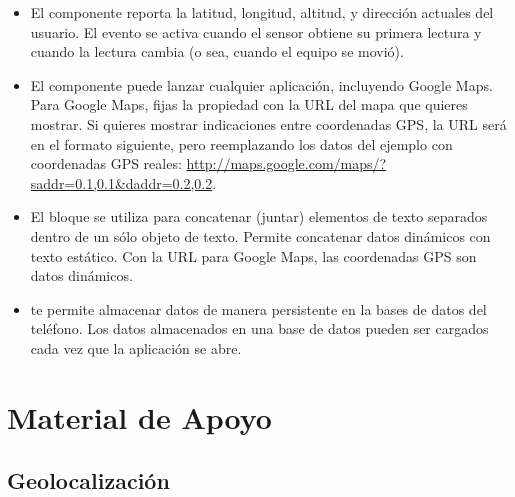 \begin{itemize}

\item El componente  reporta la latitud,
  longitud, altitud, y dirección actuales del usuario. El evento
   se activa cuando el sensor obtiene su
  primera lectura y cuando la lectura cambia (o sea, cuando el equipo
  se movió).

\item El componente  puede lanzar cualquier
  aplicación, incluyendo Google Maps. Para Google Maps, fijas la
  propiedad  con la URL del mapa que quieres
  mostrar. Si quieres mostrar indicaciones entre coordenadas GPS, la
  URL será en el formato siguiente, pero reemplazando los datos del
  ejemplo con coordenadas GPS reales:
  \url{http://maps.google.com/maps/?saddr=0.1,0.1\&daddr=0.2,0.2}.

\item El bloque  se utiliza para concatenar (juntar)
  elementos de texto separados dentro de un sólo objeto de
  texto. Permite concatenar datos dinámicos con texto estático. Con la
  URL para Google Maps, las coordenadas GPS son datos dinámicos.

\item {} te permite almacenar datos de manera
  persistente en la bases de datos del teléfono. Los datos almacenados
  en una base de datos pueden ser cargados cada vez que la aplicación
  se abre.
\end{itemize}

\section{Material de Apoyo}

\subsection*{Geolocalización}




